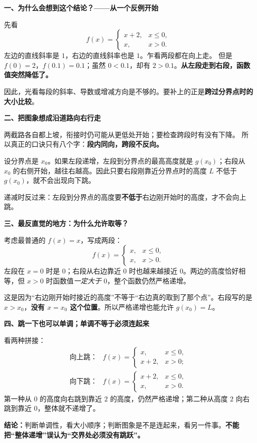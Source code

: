 \clearpage
\begin{explanationbox}
\textbf{\textcolor{CExplanation}{一、为什么会想到这个结论？——从一个反例开始}}



先看
\[
 f(x)=\begin{cases}x+2,&x\le0,\\x,&x>0.\end{cases}
\]
左边的直线斜率是 $1$，右边的直线斜率也是 $1$。乍看两段都在向上走。
但是 $f(0)=2$，$f(0.1)=0.1$；虽然 $0<0.1$，却有 $2>0.1$。\textbf{从左段走到右段，函数值突然降低了。}

因此，光看每段的斜率、导数或增减方向是不够的。要补上的正是\textbf{跨过分界点时的大小比较}。

\medskip
\textbf{\textcolor{CExplanation}{二、把图象想成沿道路向右行走}}

两截路各自都上坡，衔接时仍可能从更低处开始；要检查跨段时有没有下降。
所以真正的口诀只有八个字：\textbf{段内同向，跨段不反向。}

设分界点是 $x_0$。如果左段递增，左段到分界点的最高高度就是 $g(x_0)$；右段从 $x_0$ 的右侧开始，越往右越高。因此只要右段刚靠近分界点时的高度 $L$ 不低于 $g(x_0)$，就不会出现向下跳。

递减时反过来：左段到分界点的高度要\textbf{不低于}右边刚开始时的高度，才不会向上跳。

\medskip
\end{explanationbox}
\clearpage
\begin{explanationbox}
\textbf{\textcolor{CExplanation}{三、最反直觉的地方：为什么允许取等？}}



考虑最普通的 $f(x)=x$，写成两段：
\[
 f(x)=\begin{cases}x,&x\le0,\\x,&x>0.\end{cases}
\]
左段在 $x=0$ 时是 $0$；右段从右边靠近 $0$ 时也越来越接近 $0$。两边的高度恰好相等，但 $x>0$ 时函数值\emph{一定大于} $0$，整个函数仍然严格递增。

这是因为“右边刚开始时接近的高度”不等于“右边真的取到了那个点”。右段写的是 $x>x_0$，\textbf{没有 $x=x_0$ 这个位置}。所以严格递增也能允许 $g(x_0)=L$。

\medskip
\textbf{\textcolor{CExplanation}{四、跳一下也可以单调；单调不等于必须连起来}}

看两种拼接：
\[
\begin{array}{ll}
\text{向上跳：}&f(x)=\begin{cases}x,&x\le0,\\x+2,&x>0;\end{cases}\\[8pt]
\text{向下跳：}&f(x)=\begin{cases}x+2,&x\le0,\\x,&x>0.\end{cases}
\end{array}
\]
第一种从 $0$ 的高度向右跳到靠近 $2$ 的高度，仍然严格递增；第二种从高度 $2$ 向右跳到靠近 $0$，整体就不递增了。

\textbf{结论：}判断单调性，看大小顺序；判断图象是不是连起来，看另一件事。\textbf{不能把“整体递增”误认为“交界处必须没有跳跃”。}

\medskip
\end{explanationbox}
